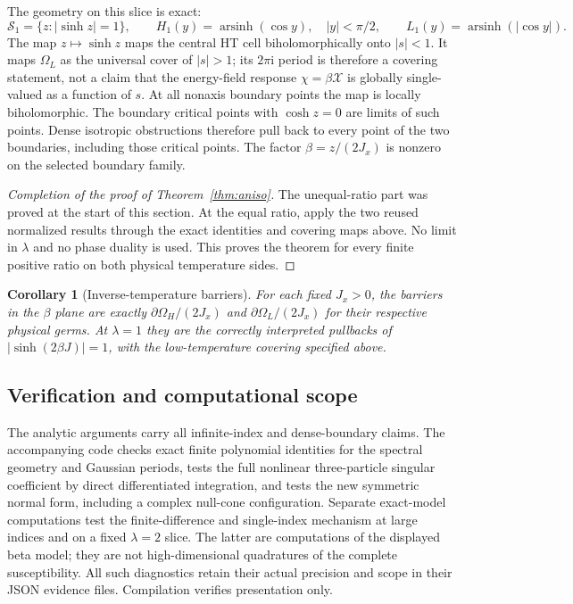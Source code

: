 \documentclass[11pt]{article}
\numberwithin{equation}{section}
\newtheorem{corollary}[theorem]{Corollary}
\theoremstyle{definition}
\newcommand{\ii}{\mathrm i}
\newcommand{\cS}{\mathcal S}
\newcommand{\OH}{\Omega_H}
\newcommand{\OL}{\Omega_L}
\begin{document}
The geometry on this slice is exact:
\[
 \cS_1=\{z:|\sinh z|=1\},\qquad
 H_1(y)=\operatorname{arsinh}(\cos y),\quad |y|<\pi/2,
 \qquad L_1(y)=\operatorname{arsinh}(|\cos y|).
\]
The map $z\mapsto\sinh z$ maps the central HT cell biholomorphically
onto $|s|<1$. It maps $\OL$ as the universal cover of $|s|>1$;
its $2\pi\ii$ period is therefore a covering statement, not a claim
that the energy-field response $\chi=\beta\mathcal X$ is globally
single-valued as a function of $s$. At all nonaxis boundary points the
map is locally biholomorphic. The boundary critical points with
$\cosh z=0$ are limits of such points. Dense isotropic obstructions
therefore pull back to every point of the two boundaries, including
those critical points. The factor $\beta=z/(2J_x)$ is nonzero on the
selected boundary family.

\begin{proof}[Completion of the proof of Theorem~\ref{thm:aniso}]
The unequal-ratio part was proved at the start of this section. At the equal ratio,
apply the two reused normalized results through the exact identities
and covering maps above. No limit in $\lambda$ and no phase duality
is used. This proves the theorem for every finite positive ratio on
both physical temperature sides.
\end{proof}

\begin{corollary}[Inverse-temperature barriers]\label{cor:alllambda}
For each fixed $J_x>0$, the barriers in the $\beta$ plane are exactly
$\partial\OH/(2J_x)$ and $\partial\OL/(2J_x)$ for their respective
physical germs. At $\lambda=1$ they are the correctly interpreted
pullbacks of $|\sinh(2\beta J)|=1$, with the low-temperature covering
specified above.
\end{corollary}

\subsection{Verification and computational scope}
The analytic arguments carry all infinite-index and dense-boundary
claims. The accompanying code checks exact finite polynomial identities
for the spectral geometry and Gaussian periods, tests the full nonlinear
three-particle singular coefficient by direct differentiated integration,
and tests the new symmetric normal form, including a complex null-cone
configuration. Separate exact-model computations test the finite-difference
and single-index mechanism at large indices and on a fixed $\lambda=2$
slice. The latter are computations of the displayed beta model; they
are not high-dimensional quadratures of the complete susceptibility.
All such diagnostics retain their actual precision and scope in their
JSON evidence files. Compilation verifies presentation only.
\end{document}
